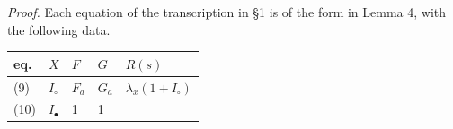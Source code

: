 \documentclass[10pt,]{article}
\begin{document}
\emph{Proof.} Each equation of the transcription in §1 is of the form in
Lemma 4, with the following data.

\begin{longtable}[]{@{}lllll@{}}
\toprule
\begin{minipage}[b]{0.17\columnwidth}\raggedright
eq.\strut
\end{minipage} & \begin{minipage}[b]{0.17\columnwidth}\raggedright
\(X\)\strut
\end{minipage} & \begin{minipage}[b]{0.17\columnwidth}\raggedright
\(F\)\strut
\end{minipage} & \begin{minipage}[b]{0.17\columnwidth}\raggedright
\(G\)\strut
\end{minipage} & \begin{minipage}[b]{0.17\columnwidth}\raggedright
\(R(s)\)\strut
\end{minipage}\tabularnewline
\midrule
\endhead
\begin{minipage}[t]{0.17\columnwidth}\raggedright
(9)\strut
\end{minipage} & \begin{minipage}[t]{0.17\columnwidth}\raggedright
\(I_\circ\)\strut
\end{minipage} & \begin{minipage}[t]{0.17\columnwidth}\raggedright
\(F_a\)\strut
\end{minipage} & \begin{minipage}[t]{0.17\columnwidth}\raggedright
\(G_a\)\strut
\end{minipage} & \begin{minipage}[t]{0.17\columnwidth}\raggedright
\(\lambda_x(1+I_\circ)\)\strut
\end{minipage}\tabularnewline
\begin{minipage}[t]{0.17\columnwidth}\raggedright
(10)\strut
\end{minipage} & \begin{minipage}[t]{0.17\columnwidth}\raggedright
\(I_\bullet\)\strut
\end{minipage} & \begin{minipage}[t]{0.17\columnwidth}\raggedright
1\strut
\end{minipage} & \begin{minipage}[t]{0.17\columnwidth}\raggedright
1\strut
\end{minipage} & \begin{minipage}[t]{0.17\columnwidth}\raggedright

\end{minipage}
\end{longtable}
\end{document}

